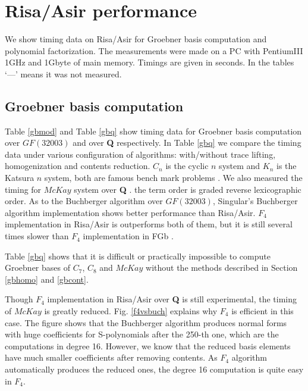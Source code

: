 \documentclass[runningheads]{cl2emult}
\begin{document}

\section{Risa/Asir performance}

We show timing data on Risa/Asir for Groebner basis computation
and polynomial factorization. The measurements were made on
a PC with PentiumIII 1GHz and 1Gbyte of main memory. Timings
are given in seconds. In the tables `---' means it was not
measured.

\subsection{Groebner basis computation}

Table \ref{gbmod} and Table \ref{gbq} show timing data for Groebner
basis computation over $GF(32003)$ and over {\bf Q} respectively.  In
Table \ref{gbq} we compare the timing data under various configuration
of algorithms: with/without trace lifting, homogenization and contents
reduction.
$C_n$ is the cyclic $n$ system and $K_n$ is the Katsura $n$ system,
both are famous bench mark problems \cite{BENCH}.  We also measured
the timing for $McKay$ system over {\bf Q} \cite{REPL}.  the term
order is graded reverse lexicographic order. 
As to the Buchberger algorithm over $GF(32003)$,
Singular\cite{SINGULAR}'s Buchberger algorithm implementation shows
better performance than Risa/Asir. $F_4$ implementation in Risa/Asir
is outperforms both of them, but it is still several times slower than
$F_4$ implementation in FGb \cite{FGB}.

Table \ref{gbq} shows that it is difficult or practically impossible
to compute Groebner bases of $C_7$, $C_8$ and $McKay$ without
the methods described in Section \ref{gbhomo} and \ref{gbcont}.

Though $F_4$ implementation in Risa/Asir over {\bf Q} is still
experimental, the timing of $McKay$ is greatly reduced.
Fig. \ref{f4vsbuch} explains why $F_4$ is efficient in this case.  The
figure shows that the Buchberger algorithm produces normal forms with
huge coefficients for S-polynomials after the 250-th one, which are
the computations in degree 16.  However, we know that the reduced
basis elements have much smaller coefficients after removing contents.
As $F_4$ algorithm automatically produces the reduced ones, the degree
16 computation is quite easy in $F_4$.
\end{document}
